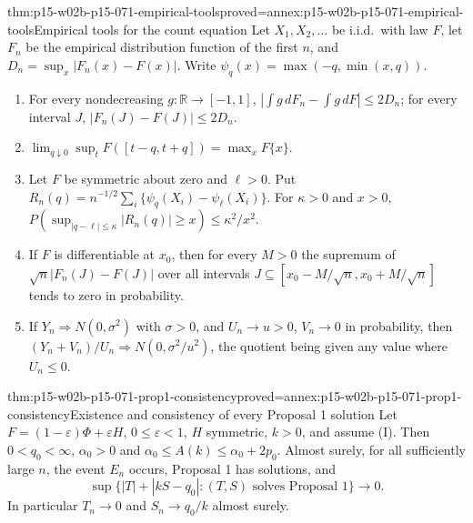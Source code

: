 \begin{hblemma}{thm:p15-w02b-p15-071-empirical-tools}{proved=annex:p15-w02b-p15-071-empirical-tools}{Empirical tools for the count equation}
Let \(X_1,X_2,\ldots\) be i.i.d.\ with law \(F\), let \(F_n\) be the
empirical distribution function of the first \(n\), and
\(D_n=\sup_x|F_n(x)-F(x)|\). Write \(\psi_q(x)=\max(-q,\min(x,q))\).
\begin{enumerate}
\item For every nondecreasing \(g:\mathbb R\to[-1,1]\),
 \(|\int g\,dF_n-\int g\,dF|\leq2D_n\); for every interval \(J\),
 \(|F_n(J)-F(J)|\leq2D_n\).
\item \(\lim_{q\downarrow0}\sup_tF([t-q,t+q])=\max_xF\{x\}\).
\item Let \(F\) be symmetric about zero and \(\ell>0\). Put
 \(R_n(q)=n^{-1/2}\sum_i\{\psi_q(X_i)-\psi_\ell(X_i)\}\). For
 \(\kappa>0\) and \(x>0\),
 \(P(\sup_{|q-\ell|\leq\kappa}|R_n(q)|\geq x)\leq\kappa^2/x^2\).
\item If \(F\) is differentiable at \(x_0\), then for every \(M>0\) the
 supremum of \(\sqrt n|F_n(J)-F(J)|\) over all intervals
 \(J\subseteq[x_0-M/\sqrt n,x_0+M/\sqrt n]\) tends to zero in
 probability.
\item If \(Y_n\Rightarrow N(0,\sigma^2)\) with \(\sigma>0\), and
 \(U_n\to u>0\), \(V_n\to0\) in probability, then
 \((Y_n+V_n)/U_n\Rightarrow N(0,\sigma^2/u^2)\), the quotient being
 given any value where \(U_n\leq0\).
\end{enumerate}
\end{hblemma}

\begin{hbtheorem}{thm:p15-w02b-p15-071-prop1-consistency}{proved=annex:p15-w02b-p15-071-prop1-consistency}{Existence and consistency of every Proposal 1 solution}
Let \(F=(1-\varepsilon)\Phi+\varepsilon H\), \(0\leq\varepsilon<1\),
\(H\) symmetric, \(k>0\), and assume (I). Then \(0<q_0<\infty\),
\(\alpha_0>0\) and
\(\alpha_0\leq A(k)\leq\alpha_0+2p_0\).
Almost surely, for all sufficiently large \(n\), the event \(E_n\)
occurs, Proposal 1 has solutions, and
\[
 \sup\{|T|+|kS-q_0|:(T,S)\text{ solves Proposal 1}\}\longrightarrow0 .
\]
In particular \(T_n\to0\) and \(S_n\to q_0/k\) almost surely.
\end{hbtheorem}

